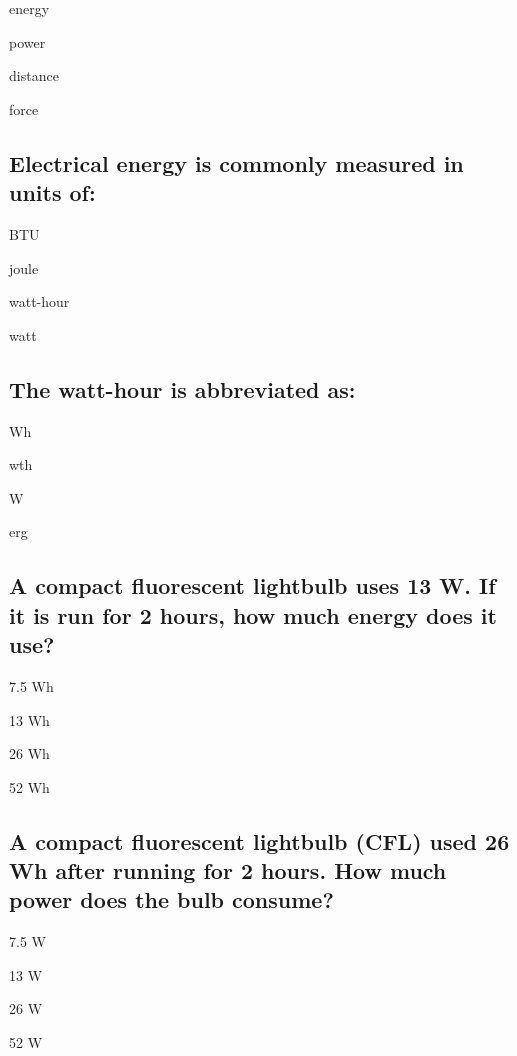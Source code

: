 \documentclass[11pt]{article}
\begin{document}
\begin{answer}
	\item energy
	\item power
	\item distance
	\item force
\end{answer}

\subsection{Electrical energy is commonly measured in units of:}

\begin{answer}
	\item BTU
	\item joule
	\item watt-hour
	\item watt
\end{answer}

\subsection{The watt-hour is abbreviated as:}

\begin{answer}
	\item Wh
	\item wth
	\item W
	\item erg
\end{answer}

\subsection{A compact fluorescent lightbulb uses 13 W. If it is run for 2 hours, how much energy does it use?}

\begin{answer}
	\item 7.5 Wh
	\item 13 Wh
	\item 26 Wh
	\item 52 Wh
\end{answer}

\subsection{A compact fluorescent lightbulb (CFL) used 26 Wh after running for 2 hours. How much power does the bulb consume?}

\begin{answer}
	\item 7.5 W
	\item 13 W
	\item 26 W
	\item 52 W
\end{answer}
\end{document}
